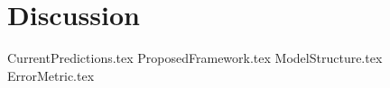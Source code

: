 
\section{Discussion}
\label{section:Discussion:Discussion}




{CurrentPredictions.tex}
{ProposedFramework.tex}
{ModelStructure.tex}
{ErrorMetric.tex}



\iffalse
In the discussion it is important to include a discussion of not just the merits of the work conducted but also the limitations. 
\fi
